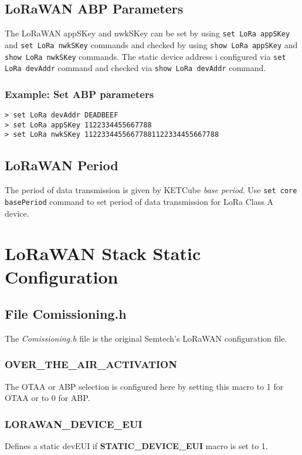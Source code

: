 \subsection{LoRaWAN ABP Parameters}
The LoRaWAN appSKey and nwkSKey can be set by using {\tt set LoRa appSKey} and {\tt set LoRa nwkSKey} commands and checked by using {\tt show LoRa appSKey} and {\tt show LoRa nwkSKey} commands. The static device address i configured via  {\tt set LoRa devAddr} command and checked via  {\tt show LoRa devAddr} command.
  
\subsubsection*{Example: Set ABP parameters}
\begin{Verbatim}[frame=single, fontsize=\small]
> set LoRa devAddr DEADBEEF
> set LoRa appSKey 1122334455667788
> set LoRa nwkSKey 11223344556677881122334455667788
\end{Verbatim}

\subsection{LoRaWAN Period}
The period of data transmission is given by KETCube {\it base period}. Use {\tt set core basePeriod} command to set period of data transmission for LoRa Class A device.
  
\clearpage
\section{LoRaWAN Stack Static Configuration}

\subsection{File Comissioning.h}
The {\it Comissioning.h} file is the original Semtech's LoRaWAN configuration file. 

\subsubsection{OVER\_THE\_AIR\_ACTIVATION}
The OTAA or ABP selection is configured here by setting this macro to 1 for OTAA or to 0 for ABP.

\subsubsection{LORAWAN\_DEVICE\_EUI} 
Defines a static devEUI if {\bf STATIC\_DEVICE\_EUI} macro is set to 1.

